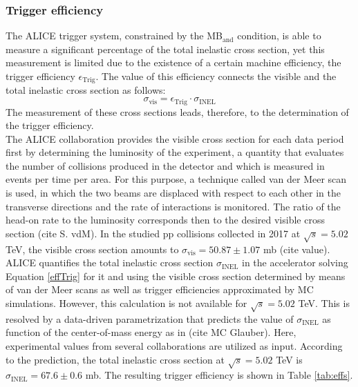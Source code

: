 \documentclass[12pt,a4paper]{report}
\begin{document}
\subsubsection{Trigger efficiency}
The ALICE trigger system, constrained by the MB$_\text{and}$ condition, is able to measure a significant percentage of the total inelastic cross section, yet this measurement is limited due to the existence of a certain machine efficiency, the trigger efficiency $\epsilon_\text{Trig}$. The value of this efficiency connects the visible and the total inelastic cross section as follows:
\begin{equation}
\sigma_\text{vis} = \epsilon_\text{Trig} \cdot \sigma_\text{INEL}
\label{effTrig}
\end{equation}
The measurement of these cross sections leads, therefore, to the determination of the trigger efficiency.\\ The ALICE collaboration provides the visible cross section for each data period first by determining the luminosity of the experiment, a quantity that evaluates the number of collisions produced in the detector and which is measured in events per time per area. For this purpose, a technique called van der Meer scan is used, in which the two beams are displaced with respect to each other in the transverse directions and the rate of interactions is monitored. The ratio of the head-on rate to the luminosity corresponds then to the desired visible cross section (cite S. vdM). In the studied pp collisions collected in 2017 at $\sqrt{s} = 5.02$ TeV, the visible cross section amounts to $\sigma_\text{vis} = 50.87 \pm 1.07$ mb (cite value). \\
ALICE quantifies the total inelastic cross section $\sigma_\text{INEL}$ in the accelerator solving Equation \ref{effTrig} for it and using the visible cross section determined by means of van der Meer scans as well as  trigger efficiencies approximated by MC simulations. However, this calculation is not available for $\sqrt{s} = 5.02$ TeV. This is resolved by a data-driven parametrization that predicts the value of $\sigma_\text{INEL}$ as function of the center-of-mass energy as in (cite MC Glauber). Here, experimental values from several collaborations are utilized as input. According to the prediction, the total inelastic cross section at $\sqrt{s} = 5.02$ TeV is  $\sigma_\text{INEL} = 67.6 \pm 0.6$ mb. The resulting trigger efficiency is shown in Table \ref{tab:effs}.
\end{document}
